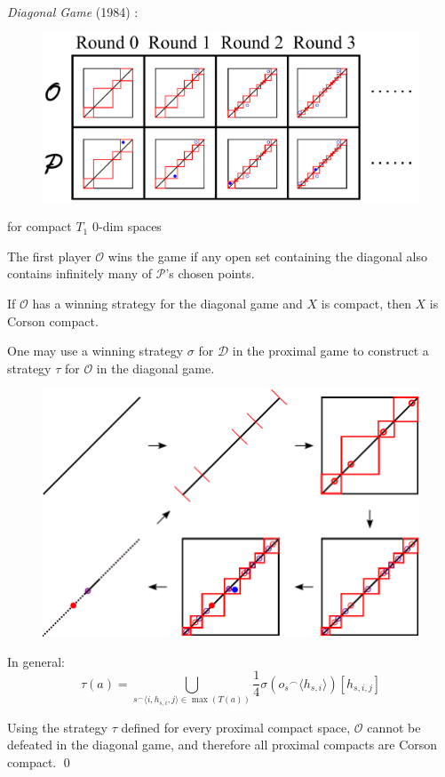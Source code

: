 \documentclass{beamer}
\theoremstyle{definition}
\newcommand{\concat}{{^\frown}}
\newcommand{\<}{\langle}
\renewcommand{\>}{\rangle}
\newcommand{\pl}[1]{\mathscr{#1}}
\newcommand{\term}{\textit}
\begin{document}
\begin{frame}
  \small
  \term{Diagonal Game} (1984) \cite{MR752278}:

  \begin{figure}
    \includegraphics[width=0.7\linewidth]{diagonalGame.pdf}
  \end{figure}
  {\tiny for compact $T_1$ $0$-dim spaces}

  \vpause

  The first player $\pl O$ wins the game if any open set containing the
  diagonal also contains infinitely many of $\pl P$'s chosen points.

  \begin{theorem}
    If $\pl O$ has a winning strategy for the diagonal game
    and $X$ is compact, then $X$ is Corson compact.
  \end{theorem}
\end{frame}

\begin{frame}
  One may use a winning strategy $\sigma$ for $\pl D$ in the proximal game to
  construct a strategy $\tau$ for $\pl O$ in the diagonal game.

  \begin{figure}
    \includegraphics[width=0.7\linewidth]{convertingStrategy.pdf}
  \end{figure}
\end{frame}

\begin{frame}
  In general:
  \[
    \tau(a)
      =
    \bigcup_{s\concat\<i,h_{s,i},j\>\in\max(T(a))}
    \frac{1}{4}\sigma(o_s\concat\<h_{s,i}\>)[h_{s,i,j}]
  \]

  \vspacing

  Using the strategy $\tau$ defined for every proximal compact space,
  $\pl O$ cannot be defeated in the diagonal game, and therefore all
  proximal compacts are Corson compact. \qed
\end{frame}
\end{document}
